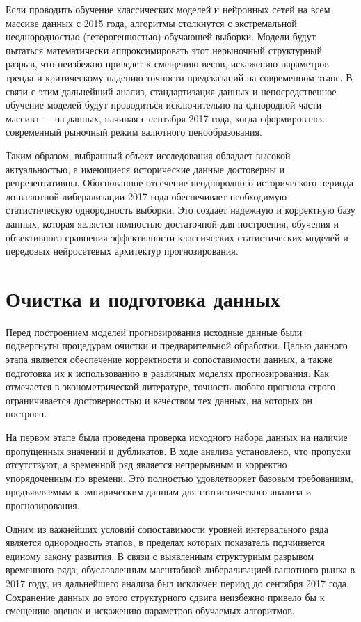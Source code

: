 Если проводить обучение классических моделей и нейронных сетей на всем массиве данных с 2015 года, алгоритмы столкнутся с экстремальной неоднородностью (гетерогенностью) обучающей выборки. Модели будут пытаться математически аппроксимировать этот нерыночный структурный разрыв, что неизбежно приведет к смещению весов, искажению параметров тренда и критическому падению точности предсказаний на современном этапе. В связи с этим дальнейший анализ, стандартизация данных и непосредственное обучение моделей будут проводиться исключительно на однородной части массива — на данных, начиная с сентября 2017 года, когда сформировался современный рыночный режим валютного ценообразования.

Таким образом, выбранный объект исследования обладает высокой актуальностью, а имеющиеся исторические данные достоверны и репрезентативны. Обоснованное отсечение неоднородного исторического периода до валютной либерализации 2017 года обеспечивает необходимую статистическую однородность выборки. Это создает надежную и корректную базу данных, которая является полностью достаточной для построения, обучения и объективного сравнения эффективности классических статистических моделей и передовых нейросетевых архитектур прогнозирования.

\section{Очистка и подготовка данных}
Перед построением моделей прогнозирования исходные данные были подвергнуты процедурам очистки и предварительной обработки. Целью данного этапа является обеспечение корректности и сопоставимости данных, а также подготовка их к использованию в различных моделях прогнозирования. Как отмечается в эконометрической литературе, точность любого прогноза строго ограничивается достоверностью и качеством тех данных, на которых он построен.

На первом этапе была проведена проверка исходного набора данных на наличие пропущенных значений и дубликатов. В ходе анализа установлено, что пропуски отсутствуют, а временной ряд является непрерывным и корректно упорядоченным по времени. Это полностью удовлетворяет базовым требованиям, предъявляемым к эмпирическим данным для статистического анализа и прогнозирования.

Одним из важнейших условий сопоставимости уровней интервального ряда является однородность этапов, в пределах которых показатель подчиняется единому закону развития. В связи с выявленным структурным разрывом временного ряда, обусловленным масштабной либерализацией валютного рынка в 2017 году, из дальнейшего анализа был исключен период до сентября 2017 года. Сохранение данных до этого структурного сдвига неизбежно привело бы к смещению оценок и искажению параметров обучаемых алгоритмов.

